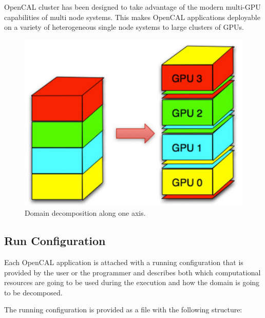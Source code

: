 OpenCAL cluster has been designed to take advantage of the modern multi-GPU capabilities of multi node systems. This makes OpenCAL applications deployable on a variety of heterogeneous single node systems to large clusters of GPUs.

  \begin{figure}
	\begin{center}
		\includegraphics[width=1.0\textwidth]{./images/opencal/multigpu_domain_decomposition.png}
		\caption{Domain decomposition along one axis.}
		\label{fig:multigpu_domain_decomposition}
	\end{center}
\end{figure}

\subsection{Run Configuration}
Each OpenCAL application is attached with a running configuration that is provided by the user or the programmer and describes both which computational resources are going to be used during the execution and how the domain is going to be decomposed.

The running configuration is provided as a file with the following structure:

